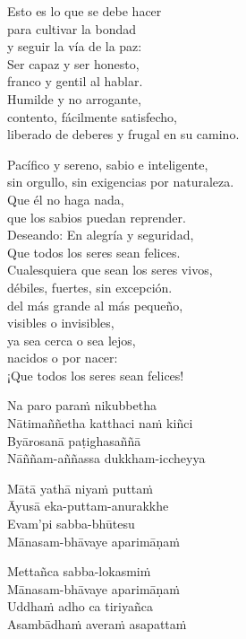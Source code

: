 
\begin{leader}
\end{leader}

Esto es lo que se debe hacer\\
para cultivar la bondad\\
y seguir la vía de la paz:\\
Ser capaz y ser honesto,\\
franco y gentil al hablar.\\
Humilde y no arrogante,\\
contento, fácilmente satisfecho,\\
liberado de deberes y frugal en su camino.

Pacífico y sereno, sabio e inteligente,\\
sin orgullo, sin exigencias por naturaleza.\\
Que él no haga nada,\\
que los sabios puedan reprender.\\
Deseando: En alegría y seguridad,\\
Que todos los seres sean felices.\\
Cualesquiera que sean los seres vivos,\\
débiles, fuertes, sin excepción.\\
del más grande al más pequeño,\\
visibles o invisibles,\\
ya sea cerca o sea lejos,\\
nacidos o por nacer: \\
¡Que todos los seres sean felices!

\clearpage

Na paro paraṁ nikubbetha\\
Nātimaññetha katthaci naṁ kiñci\\
Byārosanā paṭighasaññā\\
Nāññam-aññassa dukkham-iccheyya

Mātā yathā niyaṁ puttaṁ\\
Āyusā eka-puttam-anurakkhe\\
Evam'pi sabba-bhūtesu\\
Mānasam-bhāvaye aparimāṇaṁ

Mettañca sabba-lokasmiṁ\\
Mānasam-bhāvaye aparimāṇaṁ\\
Uddhaṁ adho ca tiriyañca\\
Asambādhaṁ averaṁ asapattaṁ

